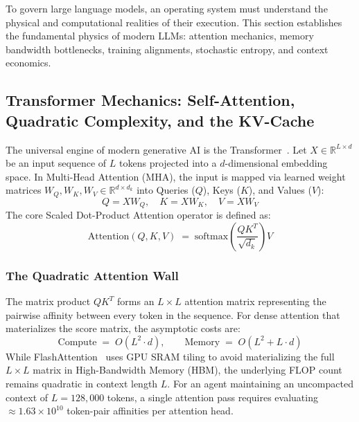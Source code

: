 \documentclass[11pt,a4paper]{article}
\begin{document}
To govern large language models, an operating system must understand the physical and computational realities of their execution. This section establishes the fundamental physics of modern LLMs: attention mechanics, memory bandwidth bottlenecks, training alignments, stochastic entropy, and context economics.

\subsection{Transformer Mechanics: Self-Attention, Quadratic Complexity, and the KV-Cache}

The universal engine of modern generative AI is the Transformer~. Let $X \in \mathbb{R}^{L \times d}$ be an input sequence of $L$ tokens projected into a $d$-dimensional embedding space. In Multi-Head Attention (MHA), the input is mapped via learned weight matrices $W_Q, W_K, W_V \in \mathbb{R}^{d \times d_k}$ into Queries ($Q$), Keys ($K$), and Values ($V$):
\begin{equation}
Q = X W_Q, \quad K = X W_K, \quad V = X W_V
\end{equation}
The core Scaled Dot-Product Attention operator is defined as:
\begin{equation}\label{eq:attention-formula}
\mathrm{Attention}(Q, K, V) \;=\; \mathrm{softmax}\left( \frac{Q K^T}{\sqrt{d_k}} \right) V
\end{equation}

\subsubsection{The Quadratic Attention Wall}
The matrix product $Q K^T$ forms an $L \times L$ attention matrix representing the pairwise affinity between every token in the sequence. For dense attention that materializes the score matrix, the asymptotic costs are:
\begin{equation}
\mathrm{Compute} \;=\; O(L^2 \cdot d), \qquad \mathrm{Memory} \;=\; O(L^2 + L \cdot d)
\end{equation}
While FlashAttention~ uses GPU SRAM tiling to avoid materializing the full $L \times L$ matrix in High-Bandwidth Memory (HBM), the underlying FLOP count remains quadratic in context length $L$. For an agent maintaining an uncompacted context of $L = 128{,}000$ tokens, a single attention pass requires evaluating $\approx 1.63 \times 10^{10}$ token-pair affinities per attention head.
\end{document}
